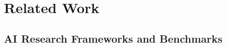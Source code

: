 \section{Related Work}
\label{sec:related}





\subsection{AI Research Frameworks and Benchmarks}

